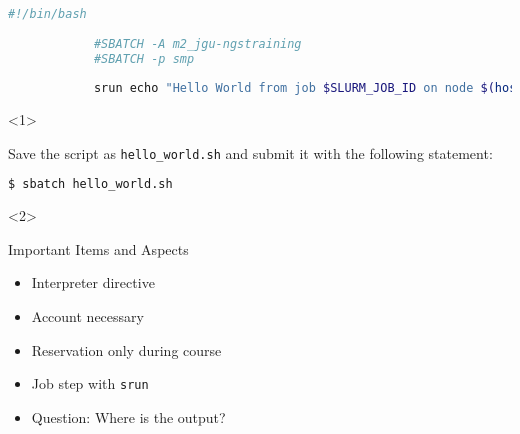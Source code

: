 \begin{frame}[fragile]
	\setcounter{handson}{\value{preframe_handson}}
	\frametitle{}
	\vspace{-2em}
	\begin{minipage}[t][0.32\textheight][t]{1.0\linewidth}
		\begin{lstlisting}[language=Bash, style=Shell, basicstyle=\scriptsize]
			#!/bin/bash
			
			#SBATCH -A m2_jgu-ngstraining
			#SBATCH -p smp
			
			srun echo "Hello World from job $SLURM_JOB_ID on node $(hostname)"
		\end{lstlisting}
	\end{minipage}\newline
	\begin{minipage}[t][0.3\textheight][t]{1.0\linewidth}
		\begin{onlyenv}<1>
			\begin{task}
				Save the script as \texttt{hello\_world.sh} and submit it with the following statement:
			\end{task}
			\begin{lstlisting}[language=Bash, style=Shell, basicstyle=\footnotesize]
				$ sbatch hello_world.sh
			\end{lstlisting}
		\end{onlyenv}
		\begin{onlyenv}<2>
			\begin{block}{Important Items and Aspects}
				\begin{itemize}
					\item Interpreter directive
					\item Account necessary
					\item Reservation only during course
					\item Job step with \texttt{srun}
					\item Question: Where is the output?
				\end{itemize}
			\end{block}
		\end{onlyenv}
	\end{minipage}
	\vfill
\end{frame}